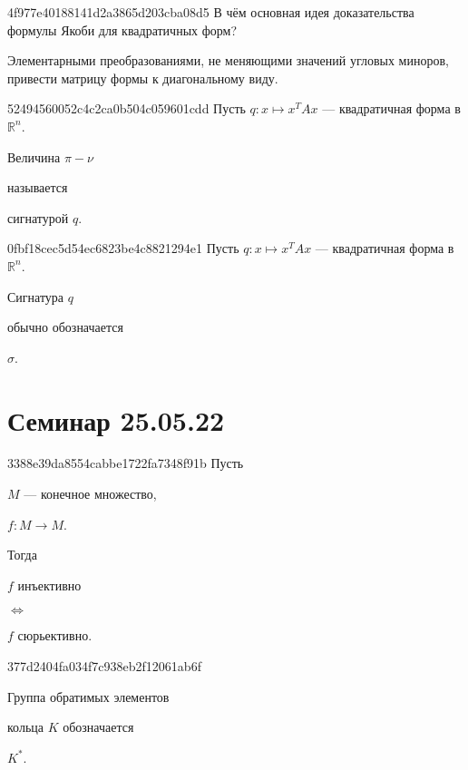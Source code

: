 \begin{note}{4f977e40188141d2a3865d203cba08d5}
    В чём основная идея доказательства формулы Якоби для квадратичных форм?

    \begin{cloze}{1}
        Элементарными преобразованиями, не меняющими значений угловых миноров, привести матрицу формы к диагональному виду.
    \end{cloze}
\end{note}

\begin{note}{52494560052c4c2ca0b504c059601cdd}
    Пусть \({ q : x \mapsto x^{T}Ax }\) --- квадратичная форма в \({ \mathbb R^{n} }\).
    \begin{icloze}{1}Величина \({ \pi - \nu }\)\end{icloze} называется \begin{icloze}{2}сигнатурой \({ q }\).\end{icloze}
\end{note}

\begin{note}{0fbf18cec5d54ec6823be4c8821294e1}
    Пусть \({ q : x \mapsto x^{T}Ax }\) --- квадратичная форма в \({ \mathbb R^{n} }\).
    \begin{icloze}{2}Сигнатура \({ q }\)\end{icloze} обычно обозначается \begin{icloze}{1}\({ \sigma }\).\end{icloze}
\end{note}

\section{Семинар 25.05.22}
\begin{note}{3388e39da8554cabbe1722fa7348f91b}
    Пусть \begin{icloze}{4}\({ M }\) --- конечное множество,\end{icloze}\: \begin{icloze}{5}\({ f : M \to M }\).\end{icloze}
    Тогда
    \begin{center}
        \begin{icloze}{3}\({ f }\) инъективно\end{icloze} \begin{icloze}{1}\({ \iff }\)\end{icloze} \begin{icloze}{2}\({ f }\) сюрьективно.\end{icloze}
    \end{center}
\end{note}

\begin{note}{377d2404fa034f7c938eb2f12061ab6f}
    \begin{icloze}{2}Группа обратимых элементов\end{icloze} кольца \({ K }\) обозначается \begin{icloze}{1}\({ K^* }\).\end{icloze}
\end{note}



